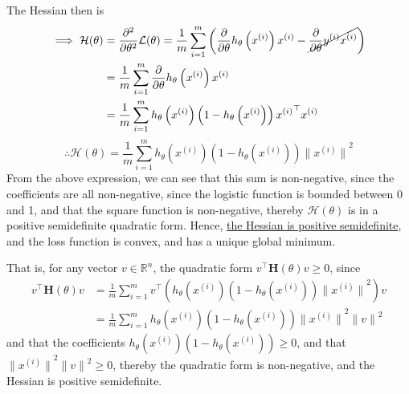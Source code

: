 The Hessian then is
\begin{align*}
    \implies
    \mathcal{H}(\theta)
     & =
    \frac{\partial^2}{\partial \theta^2} \mathcal{L}(\theta)
    =
    \frac{1}{m} \sum_{i=1}^{m}
    \left(
    \frac{\partial}{\partial \theta} h_{\theta}\left(x^{(i)}\right) x^{(i)}
    -
    \cancel{\frac{\partial}{\partial \theta} y^{(i)} x^{(i)}}
    \right)
    \\ & =
    \frac{1}{m} \sum_{i=1}^{m}
    \frac{\partial}{\partial \theta} h_{\theta}\left(x^{(i)}\right) x^{(i)}
    \\ & =
    \frac{1}{m} \sum_{i=1}^{m}
    h_{\theta}\left(x^{(i)}\right) \left(1-h_{\theta}\left(x^{(i)}\right)\right) {x^{(i)}}^\top x^{(i)}
\end{align*}
\begin{equation*}
    \therefore
    \boxed{
        \mathcal{H}(\theta)
        =
        \frac{1}{m} \sum_{i=1}^{m}
        h_{\theta}\left(x^{(i)}\right) \left(1-h_{\theta}\left(x^{(i)}\right)\right)
        {\lVert x^{(i)} \rVert}^2
    }
\end{equation*}
From the above expression, we can see that this sum is non-negative, since the coefficients are all non-negative, since the logistic function is bounded between 0 and 1, and that the square function is non-negative, thereby \( \mathcal{H}(\theta) \) is in a positive semidefinite quadratic form.
Hence, \underline{the Hessian is positive semidefinite}, and the loss function is convex, and has a unique global minimum.

That is, for any vector \( v \in \mathbb{R}^n \), the quadratic form \( v^\top \mathbf{H}(\theta) v \geq 0 \), since
\begin{align*}
    v^\top \mathbf{H}(\theta) v
     & =
    \frac{1}{m} \sum_{i=1}^{m}
    v^\top
    \left(
    h_{\theta}\left(x^{(i)}\right) \left(1-h_{\theta}\left(x^{(i)}\right)\right)
    {{\lVert x^{(i)} \rVert}^2}
    \right)
    v
    \\ & =
    \frac{1}{m} \sum_{i=1}^{m}
    h_{\theta}\left(x^{(i)}\right) \left(1-h_{\theta}\left(x^{(i)}\right)\right)
    {{\lVert x^{(i)} \rVert}^2}
    {{\lVert v \rVert}^2}
\end{align*}
and that the coefficients \( h_{\theta}\left(x^{(i)}\right) \left(1-h_{\theta}\left(x^{(i)}\right)\right) \geq 0 \), and that \( {{\lVert x^{(i)} \rVert}^2}{{\lVert v \rVert}^2} \geq 0 \), thereby the quadratic form is non-negative, and the Hessian is positive semidefinite.
